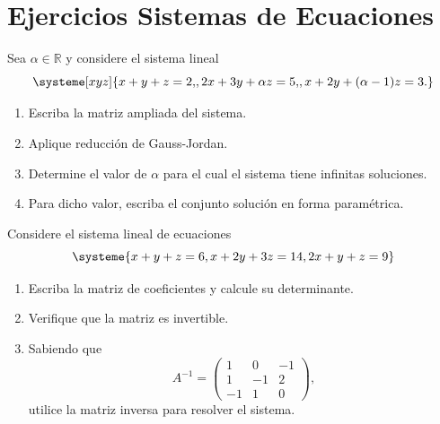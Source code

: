 \documentclass[11pt,a5]{aleph-examen}
\begin{document}
\section*{Ejercicios Sistemas de Ecuaciones}

\begin{preguntas}
\item
Sea \( \alpha \in \mathbb{R} \) y considere el sistema lineal
\[
\systeme[xyz]{
x+y+z=2{,},
2x+3y+\alpha z=5{,},
x+2y+{(\alpha-1)} z=3{.}
}
\]

\begin{enumerate}
    \item Escriba la matriz ampliada del sistema.
    \item Aplique reducción de Gauss-Jordan.
    \item Determine el valor de \( \alpha \) para el cual el sistema tiene infinitas soluciones.
    \item Para dicho valor, escriba el conjunto solución en forma paramétrica.
\end{enumerate}

\item
Considere el sistema lineal de ecuaciones
\[
\systeme{
x+y+z=6,
x+2y+3z=14,
2x+y+z=9
}
\]

\begin{enumerate}
    \item Escriba la matriz de coeficientes y calcule su determinante.
    \item Verifique que la matriz es invertible.
    \item Sabiendo que
    \[
        A^{-1}=
        \begin{pmatrix}
            1 & 0 & -1 \\
            1 & -1 & 2 \\
            -1 & 1 & 0
        \end{pmatrix},
    \]
    utilice la matriz inversa para resolver el sistema.
\end{enumerate}


\end{preguntas}
\end{document}
